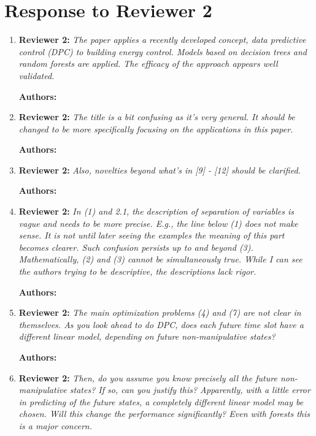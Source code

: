\documentclass{article}
\begin{document}
\section{Response to Reviewer 2}

\begin{enumerate}

\item \textbf{Reviewer 2:} \textit{The paper applies a recently developed concept, data predictive control (DPC) to building energy control. Models based on decision trees and random forests are applied. The efficacy of the approach appears well validated.}

\textbf{Authors:} 

\item \textbf{Reviewer 2:} \textit{The title is a bit confusing as it's very general. It should be changed to be more specifically focusing on the applications in this paper.}

\textbf{Authors:} 

\item \textbf{Reviewer 2:} \textit{Also, novelties beyond what's in [9] - [12] should be clarified.}

\textbf{Authors:} 

\item \textbf{Reviewer 2:} \textit{In (1) and 2.1, the description of separation of variables is vague and needs to be more precise. E.g., the line below (1) does not make sense. It is not until later seeing the examples the meaning of this part becomes clearer. Such confusion persists up to and beyond (3). Mathematically, (2) and (3) cannot be simultaneously true. While I can see the authors trying to be descriptive, the descriptions lack rigor.} 

\textbf{Authors:} 

\item \textbf{Reviewer 2:} \textit{The main optimization problems (4) and (7) are not clear in themselves. As you look ahead to do DPC, does each future time slot have a different linear model, depending on future non-manipulative states?}

\textbf{Authors:} 

\item \textbf{Reviewer 2:} \textit{Then, do you assume you know precisely all the future non-manipulative states? If so, can you justify this? Apparently, with a little error in predicting of the future states, a completely different linear model may be chosen. Will this change the performance significantly? Even with forests this is a major concern.}


\end{enumerate}
\end{document}
